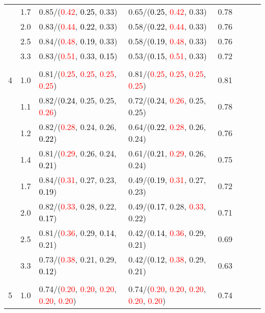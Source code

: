\documentclass[10pt,a4paper]{report}
\begin{document}
\begin{table}[!htbp]
\begin{center}
{\begin{tabular}{ccllcccc}
			&1.7&0.85/(\textcolor{red}{0.42}, \textcolor{black}{0.25}, 0.33)&0.65/(\textcolor{black}{0.25}, \textcolor{red}{0.42}, 0.33)&0.78\\
			&2.0&0.83/(\textcolor{red}{0.44}, \textcolor{black}{0.22}, 0.33)&0.58/(\textcolor{black}{0.22}, \textcolor{red}{0.44}, 0.33)&0.76\\
			&2.5&0.84/(\textcolor{red}{0.48}, \textcolor{black}{0.19}, 0.33)&0.58/(\textcolor{black}{0.19}, \textcolor{red}{0.48}, 0.33)&0.76\\
			&3.3&0.83/(\textcolor{red}{0.51}, 0.33, \textcolor{black}{0.15})&0.53/(\textcolor{black}{0.15}, \textcolor{red}{0.51}, 0.33)&0.72\\
			&&&&\\
			4			&1.0&0.81/(\textcolor{red}{0.25}, \textcolor{red}{0.25}, \textcolor{red}{0.25}, \textcolor{red}{0.25})&0.81/(\textcolor{red}{0.25}, \textcolor{red}{0.25}, \textcolor{red}{0.25}, \textcolor{red}{0.25})&0.81\\
			&1.1&0.82/(\textcolor{black}{0.24}, 0.25, 0.25, \textcolor{red}{0.26})&0.72/(\textcolor{black}{0.24}, \textcolor{red}{0.26}, 0.25, 0.25)&0.78\\
			&1.2&0.82/(\textcolor{red}{0.28}, 0.24, 0.26, \textcolor{black}{0.22})&0.64/(\textcolor{black}{0.22}, \textcolor{red}{0.28}, 0.26, 0.24)&0.76\\
			&1.4&0.81/(\textcolor{red}{0.29}, 0.26, 0.24, \textcolor{black}{0.21})&0.61/(\textcolor{black}{0.21}, \textcolor{red}{0.29}, 0.26, 0.24)&0.75\\
			&1.7&0.84/(\textcolor{red}{0.31}, 0.27, 0.23, \textcolor{black}{0.19})&0.49/(\textcolor{black}{0.19}, \textcolor{red}{0.31}, 0.27, 0.23)&0.72\\
			&2.0&0.82/(\textcolor{red}{0.33}, 0.28, 0.22, \textcolor{black}{0.17})&0.49/(\textcolor{black}{0.17}, 0.28, \textcolor{red}{0.33}, 0.22)&0.71\\
			&2.5&0.81/(\textcolor{red}{0.36}, 0.29, \textcolor{black}{0.14}, 0.21)&0.42/(\textcolor{black}{0.14}, \textcolor{red}{0.36}, 0.29, 0.21)&0.69\\
			&3.3&0.73/(\textcolor{red}{0.38}, 0.21, 0.29, \textcolor{black}{0.12})&0.42/(\textcolor{black}{0.12}, \textcolor{red}{0.38}, 0.29, 0.21)&0.63\\
			&&&&\\
			5			&1.0&0.74/(\textcolor{red}{0.20}, \textcolor{red}{0.20}, \textcolor{red}{0.20}, \textcolor{red}{0.20}, \textcolor{red}{0.20})&0.74/(\textcolor{red}{0.20}, \textcolor{red}{0.20}, \textcolor{red}{0.20}, \textcolor{red}{0.20}, \textcolor{red}{0.20})&0.74\\

\end{tabular}}
\end{center}
\end{table}
\end{document}
